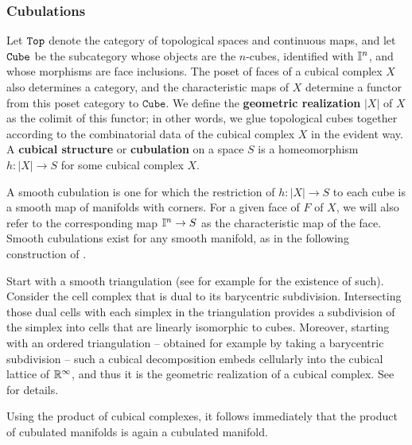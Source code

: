 \subsubsection{Cubulations}\label{S: cubulation}

Let ${\tt Top}$ denote the category of topological spaces and continuous maps, and let ${\tt Cube}$ be the subcategory whose objects are the $n$-cubes, identified with $\mathbb{I}^n$, and whose morphisms are face inclusions.
The poset of faces of a cubical complex $X$ also determines a category, and the characteristic maps of $X$ determine a functor from this poset category to $\mathtt{Cube}$.
We define the \textbf{geometric realization} $|X|$ of $X$ as the colimit of this functor; in other words, we glue topological cubes together according to the combinatorial data of the cubical complex $X$ in the evident way.
A \textbf{cubical structure} or \textbf{cubulation} on a space $S$ is a homeomorphism $h \colon |X| \to S$ for some cubical complex $X$.

A smooth cubulation is one for which the restriction of $h \colon |X| \to S$ to each cube is a smooth map of manifolds with corners.
For a given face of $F$ of $X$, we will also refer to the corresponding map $\mathbb{I}^n \to S$ as the characteristic map of the face.
Smooth cubulations exist for any smooth manifold, as in the following construction of \cite{ShSh92}.

Start with a smooth triangulation (see for example \cite[Theorem 10.6]{Munk66} for the existence of such).
Consider the cell complex that is dual to its barycentric subdivision.
Intersecting those dual cells with each simplex in the triangulation provides a subdivision of the simplex into cells that are linearly isomorphic to cubes.
Moreover, starting with an ordered triangulation -- obtained for example by taking a barycentric subdivision -- such a cubical decomposition embeds cellularly into the cubical lattice of $\mathbb{R}^\infty$, and thus it is the geometric realization of a cubical complex.
See \cite{ShSh92} for details.

Using the product of cubical complexes, it follows immediately that the product of cubulated manifolds is again a cubulated manifold.

